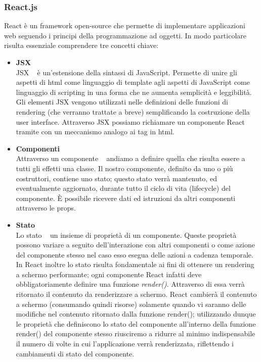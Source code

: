 \subsubsection{React.js}
React è un framework open-source che permette di implementare applicazioni web seguendo i principi della
programmazione ad oggetti. In modo particolare risulta essenziale comprendere tre
concetti chiave:
\begin{itemize}
    \item \textbf{JSX}\\
    JSX ~\cite{introduzione_jsx_react} è un'estensione della sintassi di JavaScript.\newline
    Permette di unire gli aspetti di html come linguaggio di template agli aspetti di JavaScript come linguaggio di scripting in una forma che ne aumenta semplicità e leggibilità.\newline
    Gli elementi JSX vengono utilizzati nelle definizioni delle funzioni di rendering (che verranno trattate a breve) semplificando la costruzione della user interface.\newline
    Attraverso JSX possiamo richiamare un componente React tramite con un meccanismo analogo ai tag in html.
    \item  \textbf{Componenti}\\
    Attraverso un componente ~\cite{componente_react} andiamo a definire quella che risulta essere a tutti gli effetti una classe.\newline
    Il nostro componente, definito da uno o più costruttori, contiene uno stato; questo stato verrà mantenuto, ed eventualmente aggiornato, durante tutto il ciclo di vita (lifecycle) del componente.\newline
    È possibile ricevere dati ed istruzioni da altri componenti attraverso le props.\newline
    \item \textbf{Stato}\\
    Lo stato ~\cite{state_e_lifecycle_react} un insieme di proprietà di un componente.\newline
    Queste proprietà possono variare a seguito dell'interazione con altri componenti o come azione del componente stesso nel caso esso esegua delle azioni a cadenza temporale.\newline
    In React inoltre lo stato risulta fondamentale ai fini di ottenere un rendering a schermo performante; ogni componente React infatti deve obbligatoriamente definire una funzione \emph{render()}.\newline
    Attraverso di essa verrà ritornato il contenuto da renderizzare a schermo.\newline
    React cambierà il contenuto a schermo (consumando quindi risorse) solamente quando vi saranno delle modifiche nel contenuto ritornato dalla funzione render(); utilizzando dunque le proprietà che definiscono lo stato del componente all'interno della funzione render() del componente stesso riusciremo a ridurre al minimo indispensabile il numero di volte in cui l'applicazione verrà renderizzata, riflettendo i cambiamenti di stato del componente.
\end{itemize}
